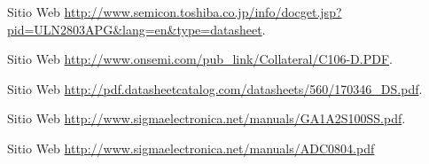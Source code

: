 \documentclass[12pt,graphicx,caption,rotating]{article}
\begin{document}

\begin{thebibliography}{99}
   Sitio Web \url{http://www.semicon.toshiba.co.jp/info/docget.jsp?pid=ULN2803APG&lang=en&type=datasheet}.
  
   Sitio Web \url{http://www.onsemi.com/pub_link/Collateral/C106-D.PDF}.
  
   Sitio Web \url{http://pdf.datasheetcatalog.com/datasheets/560/170346_DS.pdf}.
  
   Sitio Web \url{http://www.sigmaelectronica.net/manuals/GA1A2S100SS.pdf}.
  
   Sitio Web \url{http://www.sigmaelectronica.net/manuals/ADC0804.pdf}
\end{thebibliography}
\end{document}
